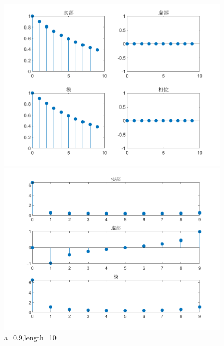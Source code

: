 \documentclass{../source/zjureport}
\begin{document}
                \begin{figure}[htbp]
                    \centering
                    \begin{minipage}[t]{0.48\textwidth}
                    \centering
                    \includegraphics[width=\textwidth]{figure/实指数序列_a=09,length=10.png}
                    \end{minipage}
                    \begin{minipage}[t]{0.48\textwidth}
                    \centering
                    \includegraphics[width=\textwidth]{figure/频谱_实指数序列_a=09,length=10.png}
                    \end{minipage}
                    \caption{a=0.9,length=10}
                \end{figure}
                
\end{document}
